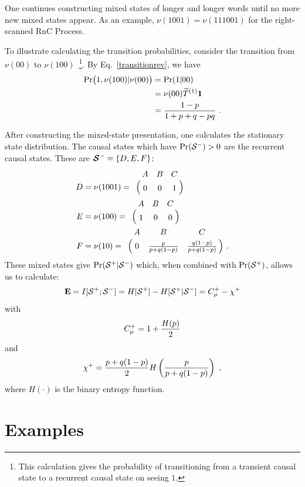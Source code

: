 One continues constructing mixed states of longer and longer words until no
more new mixed states appear. As an example, $\nu(1001) = \nu(111001)$ for 
the right-scanned RnC Process.

To illustrate calculating the transition probabilities, consider the
transition from $\nu(00)$ to $\nu(100)$~\footnote{This calculation gives
the probability of transitioning from a transient causal state to a 
recurrent causal state on seeing $1$.}.  By Eq.~\eqref{transitionrev}, we have
\begin{align*}
\Pr\bigl(1, \nu(100) | \nu(00)\bigr)
  & = \Pr(1|00)  \\
  & = \nu(00) \widetilde{T}^{(1)} \mathbf{1}  \\
  & = \frac{1-p}{1+p+q-pq} ~.
\end{align*}

After constructing the mixed-state presentation, one calculates the stationary
state distribution. The causal states which have $\Pr({\mathcal{S}}^{-}) > 0$
are the recurrent causal states. These are ${\boldsymbol{\mathcal{S}}}^{-}=\{D, E, F\}$:
\begin{align*}
D &= \nu(1001) =
  \bordermatrix{
     & A & B & C \cr
     & 0 & 0 & 1
  }\\
E &= \nu(100) =
  \bordermatrix{
     & A & B & C \cr
     & 1 & 0 & 0
  }\\
F &= \nu(10) =
  \bordermatrix{
     & A & B & C \cr
     & 0 & \frac{p}{p + q(1-p)} & \frac{q(1-p)}{p + q(1-p)}
  } ~.
\end{align*}
These mixed states give $\Pr({\mathcal{S}}^{+}|{\mathcal{S}}^{-})$
which, when combined with $\Pr({\mathcal{S}}^{+})$, allows us to calculate:
\begin{equation*}
{\bf E} = I[{\mathcal{S}}^{+}; {\mathcal{S}}^{-}] 
    = H[{\mathcal{S}}^{+}] - H[{\mathcal{S}}^{+}|{\mathcal{S}}^{-}] 
    = C_\mu^{+} - \chi^+
\end{equation*}
with
\begin{equation*}
    C_\mu^{+} = 1 + \frac{H(p)}{2} 
\end{equation*}
and
\begin{equation*}
  \chi^+ = \frac{p+q(1-p)}{2} H\left( \frac{p}{p+q(1-p)} \right) ~,
\end{equation*}
where $H(\cdot)$ is the binary entropy function.

\section{Examples}

